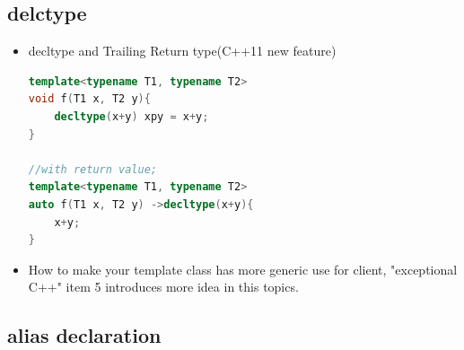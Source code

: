 \documentclass[a4paper,11pt,twoside]{book}
\begin{document}
\subsection{delctype}
\begin{itemize}


\item decltype and  Trailing Return type(C++11 new feature)
\begin{lstlisting}[frame=single, language=c++]
template<typename T1, typename T2>
void f(T1 x, T2 y){
	decltype(x+y) xpy = x+y;
}

//with return value;
template<typename T1, typename T2>
auto f(T1 x, T2 y) ->decltype(x+y){
	x+y;
}
\end{lstlisting}

\item How to make your template class has more generic use for client, "exceptional C++" item 5 introduces more idea in this topics.

\end{itemize}


\subsection{alias declaration}
\end{document}
